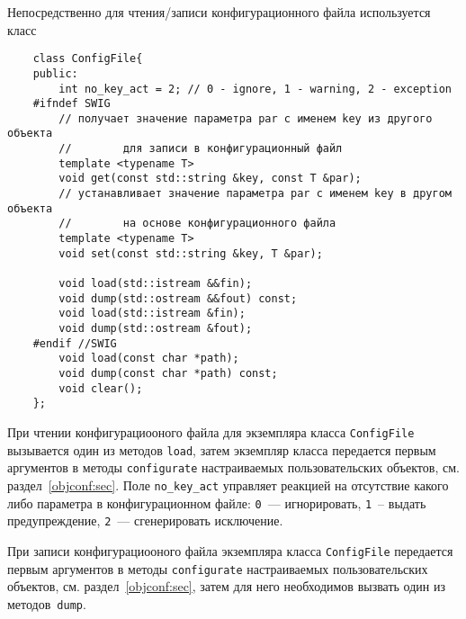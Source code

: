 Непосредственно для чтения/записи конфигурационного файла используется класс
\begin{verbatim}
    class ConfigFile{
    public:
        int no_key_act = 2; // 0 - ignore, 1 - warning, 2 - exception
    #ifndef SWIG
        // получает значение параметра par с именем key из другого объекта 
        //        для записи в конфигурационный файл
        template <typename T> 
        void get(const std::string &key, const T &par);
        // устанавливает значение параметра par с именем key в другом объекта 
        //        на основе конфигурационного файла
        template <typename T> 
        void set(const std::string &key, T &par);

        void load(std::istream &&fin);
        void dump(std::ostream &&fout) const;
        void load(std::istream &fin);
        void dump(std::ostream &fout);
    #endif //SWIG		
        void load(const char *path);
        void dump(const char *path) const;
        void clear();
    };
\end{verbatim}

При чтении конфигурациооного файла для экземпляра класса \verb'ConfigFile' вызывается один из методов \verb'load', затем экземпляр класса
передается первым аргументов в методы \verb'configurate' настраиваемых пользовательских объектов, см. раздел~\ref{objconf:sec}.
Поле \verb'no_key_act' управляет реакцией на отсутствие какого либо параметра в конфигурационном файле: \verb'0'~--- игнорировать,
\verb'1'~-- выдать предупреждение, \verb'2'~--- сгенерировать исключение.

При записи конфигурациооного файла экземпляра класса \verb'ConfigFile'
передается первым аргументов в методы \verb'configurate' настраиваемых пользовательских объектов, см. раздел~\ref{objconf:sec},
затем для него необходимов вызвать один из методов~\verb'dump'.


